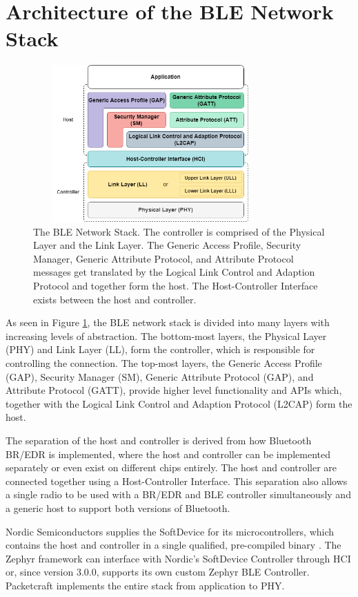 \section{Architecture of the BLE Network Stack}
\begin{figure}[]
    \centering
    \includegraphics[width=0.8\textwidth,height=6cm,keepaspectratio=true]{images/ble_stack/ble_stack.drawio.png}
    \caption{
        The BLE Network Stack. The controller is comprised of the Physical Layer and the Link Layer. The Generic Access Profile, Security Manager, Generic Attribute Protocol, and Attribute Protocol messages get translated by the Logical Link Control and Adaption Protocol and together form the host. The Host-Controller Interface exists between the host and controller.
    }
    \label{fig:ble_stack}
\end{figure}

As seen in Figure \ref{fig:ble_stack}, the BLE network stack is divided into many layers with increasing levels of abstraction. The bottom-most layers, the Physical Layer (PHY) and Link Layer (LL), form the controller, which is responsible for controlling the connection. The top-most layers, the Generic Access Profile (GAP), Security Manager (SM), Generic Attribute Protocol (GAP), and Attribute Protocol (GATT), provide higher level functionality and APIs which, together with the Logical Link Control and Adaption Protocol (L2CAP) form the host.

The separation of the host and controller is derived from how Bluetooth BR/EDR is implemented, where the host and controller can be implemented separately or even exist on different chips entirely. The host and controller are connected together using a Host-Controller Interface. This separation also allows a single radio to be used with a BR/EDR and BLE controller simultaneously and a generic host to support both versions of Bluetooth.

Nordic Semiconductors supplies the SoftDevice for its microcontrollers, which contains the host and controller in a single qualified, pre-compiled binary \cite{nordic_softdevices}. The Zephyr framework can interface with Nordic's SoftDevice Controller through HCI or, since version 3.0.0, supports its own custom Zephyr BLE Controller. Packetcraft implements the entire stack from application to PHY.

